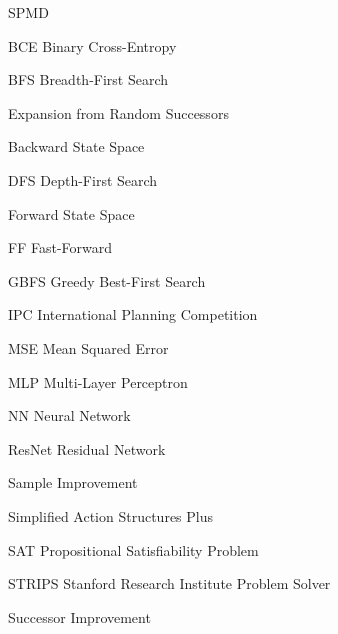 \documentclass[ppgc,diss,english]{iiufrgs}
\begin{document}
\begin{listofabbrv}{SPMD}
        \item[BCE] Binary Cross-Entropy
        \item[BFS] Breadth-First Search
        \item[\bfsrs] Expansion from Random Successors
        \item[\bsp] Backward State Space
        \item[DFS] Depth-First Search
        \item[\fsp] Forward State Space
        \item[FF] Fast-Forward
        \item[GBFS] Greedy Best-First Search
        \item[IPC] International Planning Competition
        \item[MSE] Mean Squared Error
        \item[MLP] Multi-Layer Perceptron
        \item[NN]  Neural Network
        \item[ResNet] Residual Network
        \item[\sai] Sample Improvement
        \item[\sas] Simplified Action Structures Plus
        \item[SAT] Propositional Satisfiability Problem
        \item[STRIPS] Stanford Research Institute Problem Solver
        \item[\sui] Successor Improvement
\end{listofabbrv}
\end{document}
